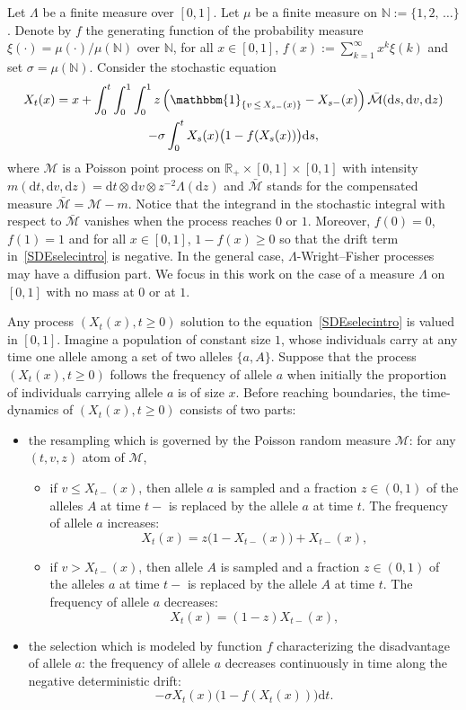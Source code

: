\documentclass[AHL,Unicode,longabstracts,published]{cedram}
\newcommand{\ddr}{\mathrm{d}}
\newcommand{\bbmun}{\mathbbm{1}}
\newcommand{\bbN}{\mathbb{N}}
\newcommand{\bbR}{\mathbb{R}}
\newcommand{\clM}{\mathcal{M}}
\begin{document}
Let $\Lambda$ be a finite measure over $[0,1]$. Let $\mu$ be a finite measure on $\bbN:=\{1,2,\,\ldots\}$. Denote by $f$ the generating function of the probability measure $\xi(\cdot)=\mu(\cdot)/\mu(\bbN)$ over $\bbN$, for all $x\in [0,1]$, $f(x):=\sum_{k=1}^{\infty}x^{k}\xi(k)$ and set $\sigma=\mu(\bbN)$. Consider the stochastic equation
\begin{multline}\label{SDEselecintro}
X_t(x)=x+\int_{0}^{t}\int_{0}^{1}\int_{0}^{1}z\left(\bbmun_{\{v\,\leq\,X_{s-}(x)\}}-X_{s-}(x)\right)\bar{\clM}(\ddr s,\ddr v, \ddr z)\\
-\sigma \int_{0}^{t}X_{s}(x)\big(1-f(X_{s}(x))\big)\ddr s,
\end{multline}
where $\clM$ is a Poisson point process on $\bbR_+\times [0,1]\times [0,1]$ with intensity $m(\ddr t,\ddr v, \ddr z)=\ddr t\otimes \ddr v\otimes z^{-2}\Lambda(\ddr z)$ and $\bar{\clM}$ stands for the compensated measure $\bar{\clM}=\clM-m$. Notice that the integrand in the stochastic integral with respect to $\bar{\clM}$ vanishes when the process reaches $0$ or $1$. Moreover, $f(0)=0$, $f(1)=1$ and for all $x\in [0,1]$, $1-f(x)\geq 0$ so that the drift term in~\eqref{SDEselecintro} is negative. In the general case, $\Lambda$-Wright--Fisher processes may have a diffusion part. We focus in this work on the case of a measure $\Lambda$ on $[0,1]$ with no mass at $0$ or at $1$.

Any process $(X_t(x),t\geq 0)$ solution to the equation~\eqref{SDEselecintro} is valued in $[0,1]$. Imagine a population of constant size $1$, whose individuals carry at any time one allele among a set of two alleles $\{a,A\}$. Suppose that the process $(X_t(x),t\geq 0)$ follows the frequency of allele $a$ when initially the proportion of individuals carrying allele $a$ is of size $x$. Before reaching boundaries, the time-dynamics of $(X_t(x),t\geq 0)$ consists of two parts:
\begin{itemize}
\item the resampling which is governed by the Poisson random measure $\clM$: for any $(t,v,z)$ atom of $\clM$,
\begin{itemize}
\item if $v\leq X_{t-}(x)$, then allele $a$ is sampled and a fraction $z\in (0,1)$ of the alleles $A$ at time $t-$ is replaced by the allele $a$ at time $t$. The frequency of allele $a$ increases:
\[
X_t(x)=z\big(1-X_{t-}(x)\big)+X_{t-}(x),
\]

\item if $v>X_{t-}(x)$, then allele $A$ is sampled and a fraction $z\in (0,1)$ of the alleles $a$ at time $t-$ is replaced by the allele $A$ at time $t$. The frequency of allele $a$ decreases:
\[
X_t(x)=(1-z)X_{t-}(x),
\]
\end{itemize}
\item the selection which is modeled by function $f$ characterizing the disadvantage of allele $a$: the frequency of allele $a$ decreases continuously in time along the negative deterministic drift:
\[
-\sigma X_t(x)\big(1-f(X_{t}(x))\big)\ddr t.
\]
\end{itemize}
\end{document}
